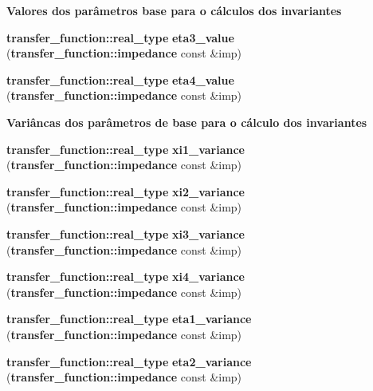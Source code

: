 \begin{Indent}{\bf Valores dos parâmetros base para o cálculos dos invariantes}
\begin{CompactItemize}
\item 
{\bf transfer\_\-function::real\_\-type} \textbf{eta3\_\-value} ({\bf transfer\_\-function::impedance} const \&imp)\label{namespaceerro__manual_1_1base__xi__eta_1_1invariant__parameter_991d71a823936b4fd3e62d11ec0d9224}

\item 
{\bf transfer\_\-function::real\_\-type} \textbf{eta4\_\-value} ({\bf transfer\_\-function::impedance} const \&imp)\label{namespaceerro__manual_1_1base__xi__eta_1_1invariant__parameter_02a0767f809177eb35f7503ed5ad9a3b}

\end{CompactItemize}
\end{Indent}
\begin{Indent}{\bf Variâncas dos parâmetros de base para o cálculo dos invariantes}\par
\begin{CompactItemize}
\item 
{\bf transfer\_\-function::real\_\-type} \textbf{xi1\_\-variance} ({\bf transfer\_\-function::impedance} const \&imp)\label{namespaceerro__manual_1_1base__xi__eta_1_1invariant__parameter_230597735a246903c6f52dba134fee59}

\item 
{\bf transfer\_\-function::real\_\-type} \textbf{xi2\_\-variance} ({\bf transfer\_\-function::impedance} const \&imp)\label{namespaceerro__manual_1_1base__xi__eta_1_1invariant__parameter_26eb6e5d66824bd1003c99880e689d9c}

\item 
{\bf transfer\_\-function::real\_\-type} \textbf{xi3\_\-variance} ({\bf transfer\_\-function::impedance} const \&imp)\label{namespaceerro__manual_1_1base__xi__eta_1_1invariant__parameter_acb10622954c2a56fbdebb01572e7799}

\item 
{\bf transfer\_\-function::real\_\-type} \textbf{xi4\_\-variance} ({\bf transfer\_\-function::impedance} const \&imp)\label{namespaceerro__manual_1_1base__xi__eta_1_1invariant__parameter_4127101bc57adc3d6b67eda4b9e55091}

\item 
{\bf transfer\_\-function::real\_\-type} \textbf{eta1\_\-variance} ({\bf transfer\_\-function::impedance} const \&imp)\label{namespaceerro__manual_1_1base__xi__eta_1_1invariant__parameter_cc9418a84f1e8f0f4366ffde63b614dd}

\item 
{\bf transfer\_\-function::real\_\-type} \textbf{eta2\_\-variance} ({\bf transfer\_\-function::impedance} const \&imp)\label{namespaceerro__manual_1_1base__xi__eta_1_1invariant__parameter_42bf87057d35608f54824f3602642afa}


\end{CompactItemize}
\end{Indent}

